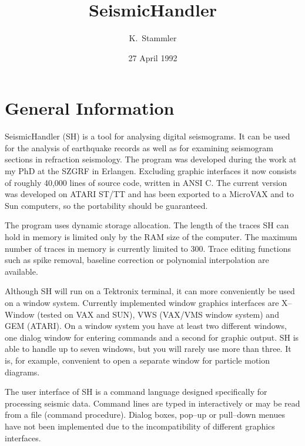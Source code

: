 

\newcommand{\exm}[1]{{\tt #1}}    %
\newcommand{\cmd}[1]{{\tt #1}}    %
\newcommand{\shi}[1]{{\sc #1}}    %
\newcommand{\sht}[1]{{\sc #1}}    %




\title{SeismicHandler}
\author{K.\ Stammler}
\date{27 April 1992}

\maketitle

\tableofcontents


\section{General Information}

SeismicHandler (SH) is a tool for analysing digital seismograms.
It can be used for the analysis of earthquake records as well as for
examining seismogram sections in refraction seismology.  The program
was developed during the work at my PhD at the SZGRF in Erlangen.
Excluding graphic interfaces it now consists of roughly 40,000 lines
of source code, written in ANSI C.  The current version was developed
on ATARI ST/TT and has been exported to a MicroVAX and to Sun
computers, so the portability should be guaranteed.

The program uses dynamic storage allocation.  The length of the traces
SH can hold in memory is limited only by the RAM size of the computer.
The maximum number of traces in memory is currently limited to 300.
Trace editing functions such as spike removal, baseline correction
or polynomial interpolation are available.

Although SH will run on a Tektronix terminal, it can more conveniently
be used on a window system.  Currently implemented window graphics
interfaces are X--Window (tested on VAX and SUN), VWS (VAX/VMS window
system) and GEM (ATARI).  On a window system you have at least two
different windows, one dialog window for entering commands and a
second for graphic output.  SH is able to handle up to seven windows,
but you will rarely use more than three.  It is, for example,
convenient to open a separate window for particle motion diagrams.

The user interface of SH is a command language designed specifically
for processing seismic data.  Command lines are typed in interactively
or may be read from a file (command procedure).  Dialog boxes,
pop--up or pull--down menues have not been implemented due to the
incompatibility of different graphics interfaces.

